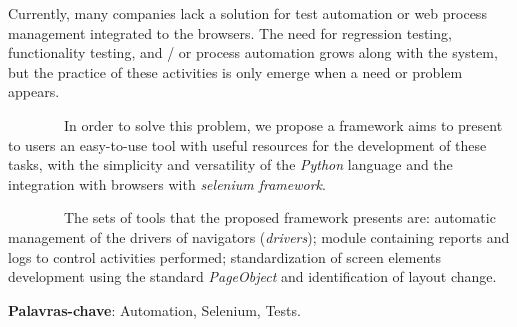 %
%

\begin{ABSTRACT}
	\begin{SingleSpace}


        Currently, many companies lack a solution for  test automation or web process management integrated to the browsers.
        The need for regression testing, functionality testing, and / or process automation grows along with the system,
        but the practice of these activities is only emerge when a need or problem appears.

        In order to solve this problem, we propose a framework aims to present to  users an easy-to-use tool with useful resources for the development of these
        tasks, with the simplicity and versatility of the \emph{Python} language and the integration with browsers with \emph{selenium framework}.

        The sets of tools that the proposed framework presents are: automatic management of the drivers of navigators (\emph{drivers}); module containing reports
        and logs to control activities performed; standardization of screen elements development using the standard \emph{PageObject} and identification of layout change.

		\vspace*{0.5cm}\hspace{-1.3 cm}\textbf{Palavras-chave}: Automation, Selenium, Tests.


	\end{SingleSpace}

\end{ABSTRACT}
